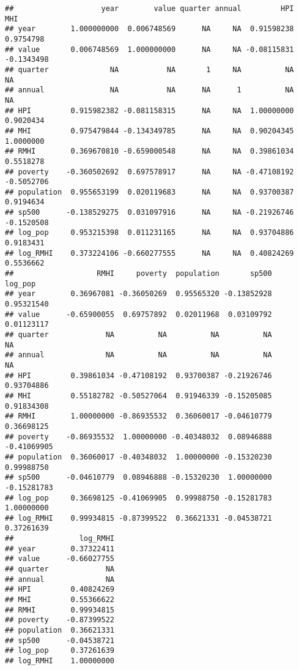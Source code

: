 \documentclass[
]{article}
\newenvironment{Shaded}{\begin{snugshade}}{\end{snugshade}}
\newcommand{\DataTypeTok}[1]{\textcolor[rgb]{0.13,0.29,0.53}{#1}}
\newcommand{\DecValTok}[1]{\textcolor[rgb]{0.00,0.00,0.81}{#1}}
\newcommand{\KeywordTok}[1]{\textcolor[rgb]{0.13,0.29,0.53}{\textbf{#1}}}
\newcommand{\NormalTok}[1]{#1}
\newcommand{\OperatorTok}[1]{\textcolor[rgb]{0.81,0.36,0.00}{\textbf{#1}}}
\newcommand{\StringTok}[1]{\textcolor[rgb]{0.31,0.60,0.02}{#1}}
\begin{document}
\begin{verbatim}
##                    year        value quarter annual         HPI        MHI
## year        1.000000000  0.006748569      NA     NA  0.91598238  0.9754798
## value       0.006748569  1.000000000      NA     NA -0.08115831 -0.1343498
## quarter              NA           NA       1     NA          NA         NA
## annual               NA           NA      NA      1          NA         NA
## HPI         0.915982382 -0.081158315      NA     NA  1.00000000  0.9020434
## MHI         0.975479844 -0.134349785      NA     NA  0.90204345  1.0000000
## RMHI        0.369670810 -0.659000548      NA     NA  0.39861034  0.5518278
## poverty    -0.360502692  0.697578917      NA     NA -0.47108192 -0.5052706
## population  0.955653199  0.020119683      NA     NA  0.93700387  0.9194634
## sp500      -0.138529275  0.031097916      NA     NA -0.21926746 -0.1520508
## log_pop     0.953215398  0.011231165      NA     NA  0.93704886  0.9183431
## log_RMHI    0.373224106 -0.660277555      NA     NA  0.40824269  0.5536662
##                   RMHI     poverty  population       sp500     log_pop
## year        0.36967081 -0.36050269  0.95565320 -0.13852928  0.95321540
## value      -0.65900055  0.69757892  0.02011968  0.03109792  0.01123117
## quarter             NA          NA          NA          NA          NA
## annual              NA          NA          NA          NA          NA
## HPI         0.39861034 -0.47108192  0.93700387 -0.21926746  0.93704886
## MHI         0.55182782 -0.50527064  0.91946339 -0.15205085  0.91834308
## RMHI        1.00000000 -0.86935532  0.36060017 -0.04610779  0.36698125
## poverty    -0.86935532  1.00000000 -0.40348032  0.08946888 -0.41069905
## population  0.36060017 -0.40348032  1.00000000 -0.15320230  0.99988750
## sp500      -0.04610779  0.08946888 -0.15320230  1.00000000 -0.15281783
## log_pop     0.36698125 -0.41069905  0.99988750 -0.15281783  1.00000000
## log_RMHI    0.99934815 -0.87399522  0.36621331 -0.04538721  0.37261639
##               log_RMHI
## year        0.37322411
## value      -0.66027755
## quarter             NA
## annual              NA
## HPI         0.40824269
## MHI         0.55366622
## RMHI        0.99934815
## poverty    -0.87399522
## population  0.36621331
## sp500      -0.04538721
## log_pop     0.37261639
## log_RMHI    1.00000000
\end{verbatim}

\begin{Shaded}
\end{Shaded}
\end{document}

